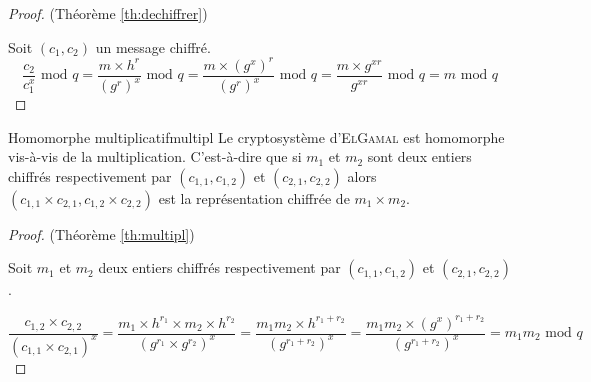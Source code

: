 \documentclass[a4paper, 12pt]{report}
\begin{document}
            \begin{proof}
                (Théorème \ref{th:dechiffrer})
                
                Soit $(c_1, c_2)$ un message chiffré.
                \[\dfrac{c_2}{c_1^x}\text{ mod }q = \dfrac{m\times h^r}{(g^r)^x}\text{ mod }q = \dfrac{m\times (g^x)^r}{(g^r)^x}\text{ mod }q = \dfrac{m\times g^{xr}}{g^{xr}}\text{ mod }q = m\text{ mod }q\]
            \end{proof}
            \begin{theorem}{Homomorphe multiplicatif}{multipl}
                Le cryptosystème d'\textsc{ElGamal} est homomorphe vis-à-vis de la multiplication. C'est-à-dire que si $m_1$ et $m_2$ sont deux entiers chiffrés respectivement par $(c_{1, 1}, c_{1, 2})$ et $(c_{2, 1}, c_{2, 2})$ alors $(c_{1, 1}\times c_{2, 1}, c_{1, 2}\times c_{2, 2})$ est la représentation chiffrée de $m_1\times m_2$.
            \end{theorem}
            \begin{proof}
                (Théorème \ref{th:multipl})
                
                Soit $m_1$ et $m_2$ deux entiers chiffrés respectivement par $(c_{1, 1}, c_{1, 2})$ et $(c_{2, 1}, c_{2, 2})$.
                
                \[\dfrac{c_{1, 2}\times c_{2, 2}}{(c_{1, 1}\times c_{2, 1})^x} = \dfrac{m_1\times h^{r_1}\times m_2 \times h^{r_2}}{(g^{r_1}\times g^{r_2})^x} = \dfrac{m_1m_2\times h^{r_1+r_2}}{(g^{r_1+r_2})^x} = \dfrac{m_1m_2\times(g^x)^{r_1+r_2}}{(g^{r_1+r_2})^x} = m_1m_2\text{ mod }q\]
            \end{proof}
\end{document}
